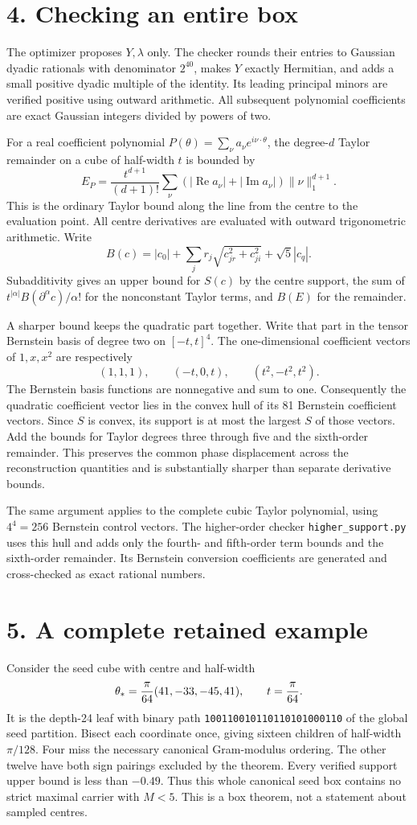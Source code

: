 \documentclass[11pt]{article}
\newcommand{\Rea}{\operatorname{Re}}
\newcommand{\Ima}{\operatorname{Im}}
\begin{document}
\section*{4. Checking an entire box}
The optimizer proposes $Y,\lambda$ only. The checker rounds their
entries to Gaussian dyadic rationals with denominator $2^{40}$,
makes $Y$ exactly Hermitian, and adds a small positive dyadic multiple
of the identity. Its leading principal minors are verified positive
using outward arithmetic. All subsequent polynomial coefficients
are exact Gaussian integers divided by powers of two.

For a real coefficient polynomial
$P(\theta)=\sum_\nu a_\nu e^{i\nu\cdot\theta}$, the degree-$d$
Taylor remainder on a cube of half-width $t$ is bounded by
\[
 E_P=\frac{t^{d+1}}{(d+1)!}
       \sum_\nu (|\Rea a_\nu|+|\Ima a_\nu|)\|\nu\|_1^{d+1}.
\]
This is the ordinary Taylor bound along the line from the centre
to the evaluation point. All centre derivatives are evaluated with
outward trigonometric arithmetic. Write
\[
 B(c)=|c_0|+\sum_jr_j\sqrt{c_{jr}^2+c_{ji}^2}+\sqrt5|c_q|.
\]
Subadditivity gives an upper bound for $S(c)$ by the centre support,
the sum of $t^{|\alpha|}B(\partial^\alpha c)/\alpha!$ for the
nonconstant Taylor terms, and $B(E)$ for the remainder.

A sharper bound keeps the quadratic part together. Write that part
in the tensor Bernstein basis of degree two on $[-t,t]^4$. The
one-dimensional coefficient vectors of $1,x,x^2$ are respectively
\[
 (1,1,1),\qquad(-t,0,t),\qquad(t^2,-t^2,t^2).
\]
The Bernstein basis functions are nonnegative and sum to one.
Consequently the quadratic coefficient vector lies in the convex hull
of its 81 Bernstein coefficient vectors. Since $S$ is convex, its
support is at most the largest $S$ of those vectors. Add the bounds
for Taylor degrees three through five and the sixth-order remainder.
This preserves the common phase displacement across the reconstruction
quantities and is substantially sharper than separate derivative bounds.

The same argument applies to the complete cubic Taylor polynomial,
using $4^4=256$ Bernstein control vectors. The higher-order checker
\texttt{higher\_support.py} uses this hull and adds only the fourth-
and fifth-order term bounds and the sixth-order remainder. Its
Bernstein conversion coefficients are generated and cross-checked
as exact rational numbers.

\section*{5. A complete retained example}
Consider the seed cube with centre and half-width
\[
 \theta_*={\pi\over64}(41,-33,-45,41),\qquad t={\pi\over64}.
\]
It is the depth-24 leaf with binary path
\texttt{100110010110110101000110} of the global seed partition.
Bisect each coordinate once, giving sixteen children of half-width
$\pi/128$. Four miss the necessary canonical Gram-modulus ordering.
The other twelve have both sign pairings excluded by the theorem.
Every verified support upper bound is less than $-0.49$.
Thus this whole canonical seed box contains no strict maximal carrier
with $M<5$. This is a box theorem, not a statement about sampled centres.
\end{document}
